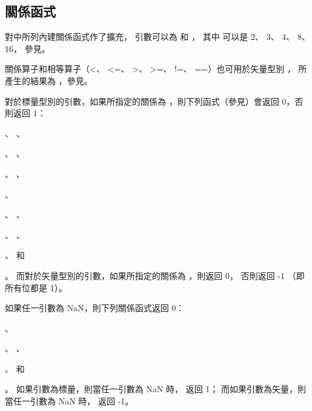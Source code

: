 \subsection[section:relationFunc]{關係函式}

對中所列內建關係函式作了擴充，
引數可以為  和 ，
其中  可以是 2、 3、 4、 8、 16，
參見。

關係算子和相等算子（<、 <=、 >、 >=、 !=、 ==）也可用於矢量型別 ，
所產生的結果為 ，參見\insection[operator]。

對於標量型別的引數，如果所指定的關係為 {}，則下列函式（參見）會返回 0，否則返回 1：
\startigBase[indentnext=no]
\item {}、 、
\item {}、 、
\item {}、 、
\item {}、
\item {}、 、
\item {}、 、
\item {}、  和
\item {}。
\stopigBase
而對於矢量型別的引數，如果所指定的關係為 {}，則返回 0，
否則返回 -1 （即所有位都是 1）。

如果任一引數為 NaN，則下列關係函式返回 0：
\startigBase[indentnext=no]
\item {}、
\item {}、 、
\item {}、  和
\item {}。
\stopigBase
如果引數為標量，則當任一引數為 NaN 時，  返回 1；
而如果引數為矢量，則當任一引數為 NaN 時，  返回 -1。

{}
